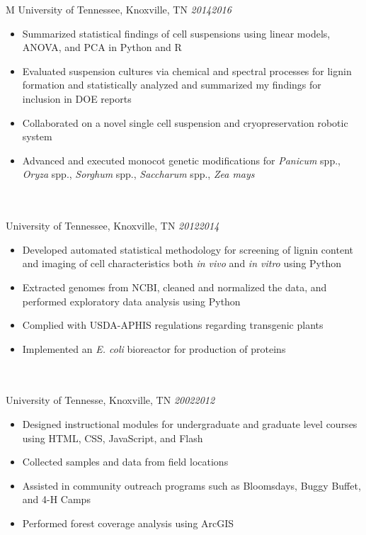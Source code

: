 \documentclass[10pt]{article}%
\begin{document}
\begin{tabularx}{\linewidth}{M}
       University of Tennessee, Knoxville, TN \textit{2014\textemdash{}2016} \\
       \begin{itemize}[topsep=-12pt,parsep=0em]
            \setlength\itemsep{0em}
            \item Summarized statistical findings of cell suspensions using linear models, ANOVA, and PCA in Python and R %
            \item Evaluated suspension cultures via chemical and spectral processes for lignin formation and statistically analyzed and summarized my findings for inclusion in DOE reports %
            \item Collaborated on a novel single cell suspension and cryopreservation robotic system %
            \item Advanced and executed monocot genetic modifications for \textit{Panicum} spp., \textit{Oryza} spp., \textit{Sorghum} spp., \textit{Saccharum} spp., \textit{Zea mays}
         \end{itemize} \\
        \\
       University of Tennessee, Knoxville, TN \textit{2012\textemdash{}2014} \\
       \begin{itemize}[topsep=-12pt,parsep=0em]
            \setlength\itemsep{0em}
            \item Developed automated statistical methodology for screening of lignin content and imaging of cell characteristics both \textit{in vivo} and \textit{in vitro} using Python%
            \item Extracted genomes from NCBI, cleaned and normalized the data, and performed exploratory data analysis using Python
            \item Complied with USDA-APHIS regulations regarding transgenic plants
            \item Implemented an \textit{E. coli} bioreactor for production of proteins
         \end{itemize} \\
         \\
        University of Tennesse, Knoxville, TN \textit{2002\textemdash{}2012} \\
        \begin{itemize}[topsep=-12pt,parsep=0em]
        	    \setlength\itemsep{0em}
        	    \item Designed instructional modules for undergraduate and graduate level courses using HTML, CSS, JavaScript, and Flash
        	    \item Collected samples and data from field locations
        	    \item Assisted in community outreach programs such as Bloomsdays, Buggy Buffet, and 4-H Camps
        	    \item Performed forest coverage analysis using ArcGIS
        \end{itemize}
    \end{tabularx}
\end{document}
